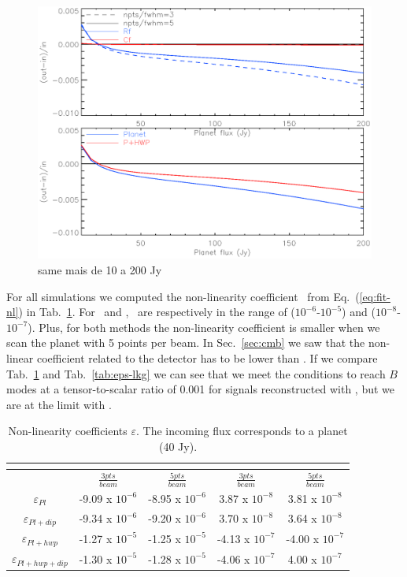 \begin{figure}[h]
\center
	\includegraphics[scale=0.5]{Figures/diff-rf-cf-10-200jy-2.eps}
	\caption{same mais de 10 a 200 Jy}
	\label{fig:diff-rf-cf}
\end{figure}


For all simulations we computed the non-linearity coefficient \epsDET\ from Eq.~(\ref{eq:fit-nl}) in Tab.~\ref{tab:eps}. For \rf\ and \cf , \epsDET\ are respectively in the range of ($10^{-6}$-$10^{-5}$) and ($10^{-8}$-$10^{-7}$). Plus, for both methods the non-linearity coefficient is smaller when we scan the planet with 5 points per beam. In Sec.~\ref{sec:cmb} we saw that the non-linear coefficient related to the detector \epsDET has to be lower than \epsCMB. If we compare Tab.~\ref{tab:eps} and Tab.~\ref{tab:eps-lkg} we can see that we meet the conditions to reach $B$ modes at a tensor-to-scalar ratio of 0.001 for signals reconstructed with \cf , but we are at the limit with \rf .\\

\begin{table}
\tiny
\begin{tabular}{|c|c|c|c|c|}
	\hline
	    & \multicolumn{2}{|c|}{\rf} & \multicolumn{2}{|c|}{\cf} \\
	\hline
	    & $\frac{3pts}{beam}$ & $\frac{5pts}{beam}$ & $\frac{3pts}{beam}$ & $\frac{5pts}{beam}$ \\
	    \hline
	    $\varepsilon_{Pl}$ & -9.09 x $10^{-6}$ & -8.95 x $10^{-6}$ & 3.87 x $10^{-8}$ & 3.81 x $10^{-8}$ \\ 
	    \hline
	    $\varepsilon_{Pl+dip}$ & -9.34 x $10^{-6}$ & -9.20 x $10^{-6}$ & 3.70 x $10^{-8}$ & 3.64 x $10^{-8}$ \\
	    \hline
	    $\varepsilon_{Pl+hwp}$ & -1.27 x $10^{-5}$ & -1.25 x $10^{-5}$ & -4.13 x $10^{-7}$ & -4.00 x $10^{-7}$ \\
	\hline
	$\varepsilon_{Pl+hwp+dip}$ & -1.30 x $10^{-5}$ & -1.28 x $10^{-5}$ & -4.06 x $10^{-7}$ & 4.00 x $10^{-7}$ \\
	\hline
\end{tabular}
\caption{Non-linearity coefficients $\varepsilon$. The incoming flux corresponds to a planet (40 Jy).}
\label{tab:eps}
\end{table}

